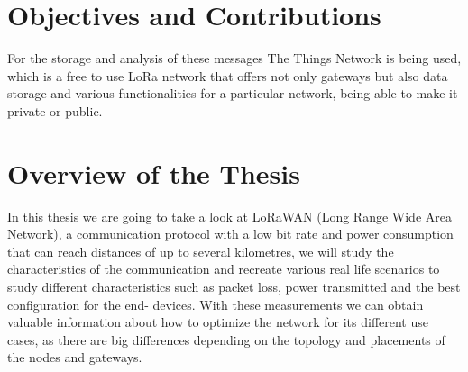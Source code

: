 \section{Objectives and Contributions}
\label{objectives}
For the storage and analysis of these messages The Things Network is
being used, which is a free to use LoRa network that offers not only
gateways but also data storage and various functionalities for a
particular network, being able to make it private or public.

\section{Overview of the Thesis}
\label{overview}
In this thesis we are going to take a look at LoRaWAN (Long Range
Wide Area Network), a communication protocol with a low bit rate and
power consumption that can reach distances of up to several kilometres,
we will study the characteristics of the communication and recreate
various real life scenarios to study different characteristics such as
packet loss, power transmitted and the best configuration for the end-
devices. With these measurements we can obtain valuable information
about how to optimize the network for its different use cases, as there
are big differences depending on the topology and placements of the
nodes and gateways.